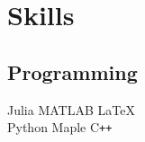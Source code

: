 \documentclass[letterpaper]{pine-resume} %
\begin{document}
\begin{minipage}[t]{0.33\textwidth}
\sectionspace %


\section{Skills}

\subsection{Programming}
Julia \textbullet{} MATLAB \textbullet{} \LaTeX\ \\
Python \textbullet{} Maple \textbullet{} C\texttt{++}\\

\sectionspace %


\end{minipage}%
\hfill
\end{document}
